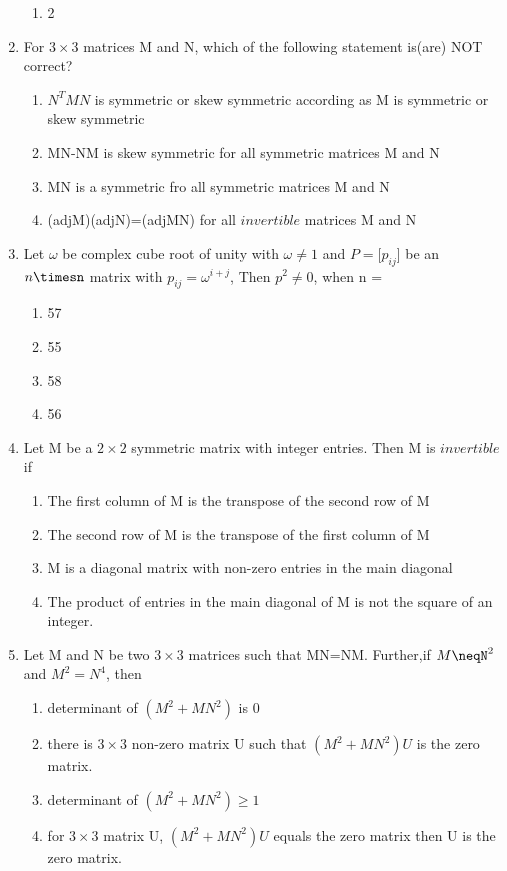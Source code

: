 \begin{enumerate}
\begin{enumerate}
 \item  2
\end{enumerate}
\item For $3\times3$ matrices M and N, which of the following statement is(are) NOT correct?
\begin{enumerate}
 \item $N^TMN$ is symmetric or skew symmetric according as M is symmetric or skew symmetric
 \item MN-NM is skew symmetric for all symmetric matrices M and N
 \item MN is a symmetric fro all symmetric matrices M and N
 \item (adjM)(adjN)=(adjMN) for all $invertible$ matrices M and N
\end{enumerate}
\item Let $\omega$ be complex cube root of unity with $\omega\neq1$ and $P=[p_{ij}$] be an $n\timesn$ matrix with $p_{ij}=\omega^{i+j}$, Then $p^2\neq0$, when n =
\begin{enumerate}
 \item 57
 \item 55
 \item 58
 \item  56
\end{enumerate}
\item Let M be a $2\times2$ symmetric matrix with integer entries. Then M is $invertible$ if
\begin{enumerate}
 \item The first column of M is the transpose of the second row of M
 \item The second row of M is the transpose of the first column of M
 \item M is a diagonal matrix with non-zero entries in the main diagonal
 \item The product of entries in the main diagonal of M is not the square of an integer. \end{enumerate}
\item Let M and N be two $3\times3$ matrices such that MN=NM. Further,if $M\neqN^2$ and  $M^2=N^4$, then
\begin{enumerate}
 \item determinant of $(M^2+MN^2)$ is 0
 \item there is $3\times3$ non-zero matrix U such that  $(M^2+MN^2)U$ is the zero matrix.
 \item determinant of  $(M^2+MN^2)\geq1$
 \item for $3\times3$ matrix U, $(M^2+MN^2)U$ equals the zero matrix then U is the zero matrix. 

\end{enumerate}
\end{enumerate}

